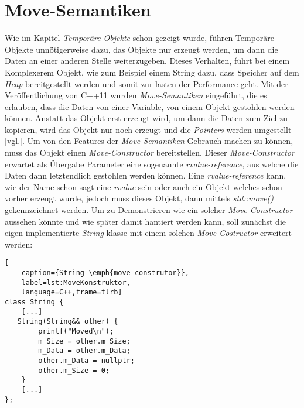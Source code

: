 \section{Move-Semantiken}
Wie im Kapitel \emph{Temporäre Objekte} schon gezeigt wurde, führen Temporäre Objekte unnötigerweise
dazu, das Objekte nur erzeugt werden, um dann die Daten an einer anderen Stelle weiterzugeben.
Dieses Verhalten, führt bei einem Komplexerem Objekt, wie zum Beispiel einem String dazu, dass
Speicher auf dem \emph{Heap} bereitgestellt werden und somit zur lasten der Performance geht.
\newline
\newline
Mit der Veröffentlichung von C++11 wurden \emph{Move-Semantiken} eingeführt, die es erlauben, dass
die Daten von einer Variable, von einem Objekt gestohlen werden können. Anstatt das Objekt
erst erzeugt wird, um dann die Daten zum Ziel zu kopieren, wird das Objekt nur noch erzeugt und
die \emph{Pointers} werden umgestellt \cite{VisualisingC++}[vgl.]. Um von den Features der
\emph{Move-Semantiken} Gebrauch machen zu können, muss das Objekt einen \emph{Move-Constructor}
bereitstellen. Dieser \emph{Move-Constructor} erwartet als Übergabe Parameter eine sogenannte
\emph{rvalue-reference}, aus welche die Daten dann letztendlich gestohlen werden können. Eine
\emph{rvalue-reference} kann, wie der Name schon sagt eine \emph{rvalue} sein oder auch ein Objekt
welches schon vorher erzeugt wurde, jedoch muss dieses Objekt, dann mittels \emph{std::move()}
gekennzeichnet werden.
\newline
\newline
Um zu Demonstrieren wie ein solcher \emph{Move-Constructor} aussehen könnte und wie später damit
hantiert werden kann, soll zunächst die eigen-implementierte \emph{String} klasse mit einem solchen
\emph{Move-Costructor} erweitert werden:

\begin{lstlisting}[
    caption={String \emph{move construtor}},
    label=lst:MoveKonstruktor,
    language=C++,frame=tlrb]
class String {
	[...]
   String(String&& other) {
        printf("Moved\n");
        m_Size = other.m_Size;
        m_Data = other.m_Data;
        other.m_Data = nullptr;
        other.m_Size = 0;
    }
	[...]
};
\end{lstlisting}

